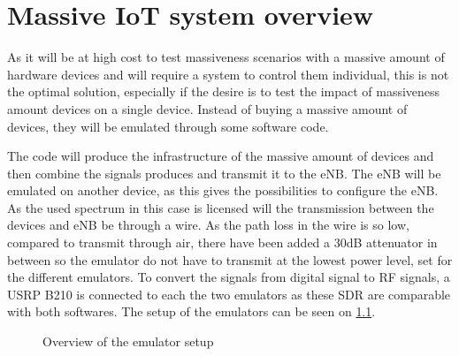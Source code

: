 \chapter{Massive IoT system overview}

As it will be at high cost to test massiveness scenarios with a massive amount of hardware devices and will require a system to control them individual, this is not the optimal solution, especially if the desire is to test the impact of massiveness amount devices on a single device. Instead of buying a massive amount of devices, they will be emulated through some software code.

The code will produce the infrastructure of the massive amount of devices and then combine the signals produces and transmit it to the \gls{eNB}. The eNB will be emulated on another device, as this gives the possibilities to configure the eNB. As the used spectrum in this case  is licensed will the transmission between the devices and eNB be through a wire. As the path loss in the wire is so low, compared to transmit through air, there have been added a 30dB attenuator in between so the emulator do not have to transmit at the lowest power level, set for the different emulators. To convert the signals from digital signal to RF signals, a USRP B210 is connected to each the two emulators as these \gls{SDR} are comparable with both softwares. The setup of the emulators can be seen on \ref{fig:MassSetup}.

\begin{figure}[H]
\centering
\resizebox{0.9\textwidth}{!}{
}
\caption{Overview of the emulator setup}
\label{fig:MassSetup}
\end{figure}




